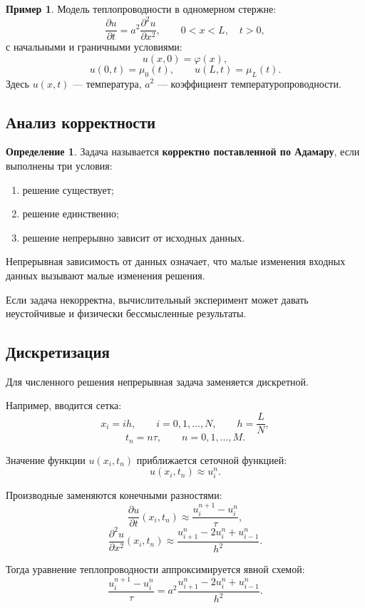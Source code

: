 \documentclass[12pt,a4paper]{article}
\theoremstyle{definition}
\newtheorem{definition}{Определение}
\newtheorem{example}{Пример}
\theoremstyle{plain}
\begin{document}
\begin{example}
Модель теплопроводности в одномерном стержне:
\[
\frac{\partial u}{\partial t}
=
a^2 \frac{\partial^2 u}{\partial x^2},
\qquad
0 < x < L,\quad t>0,
\]
с начальными и граничными условиями:
\[
u(x,0)=\varphi(x),
\]
\[
u(0,t)=\mu_0(t), \qquad u(L,t)=\mu_L(t).
\]
Здесь $u(x,t)$ --- температура, $a^2$ --- коэффициент температуропроводности.
\end{example}

\subsection{Анализ корректности}

\begin{definition}
Задача называется \textbf{корректно поставленной по Адамару}, если выполнены три условия:
\begin{enumerate}
    \item решение существует;
    \item решение единственно;
    \item решение непрерывно зависит от исходных данных.
\end{enumerate}
\end{definition}

Непрерывная зависимость от данных означает, что малые изменения входных данных вызывают малые изменения решения.

Если задача некорректна, вычислительный эксперимент может давать неустойчивые и физически бессмысленные результаты.

\subsection{Дискретизация}

Для численного решения непрерывная задача заменяется дискретной.

Например, вводится сетка:
\[
x_i = ih,\qquad i=0,1,\dots,N,\qquad h=\frac{L}{N},
\]
\[
t_n = n\tau,\qquad n=0,1,\dots,M.
\]

Значение функции $u(x_i,t_n)$ приближается сеточной функцией:
\[
u(x_i,t_n) \approx u_i^n.
\]

Производные заменяются конечными разностями:
\[
\frac{\partial u}{\partial t}(x_i,t_n)
\approx
\frac{u_i^{n+1}-u_i^n}{\tau},
\]
\[
\frac{\partial^2 u}{\partial x^2}(x_i,t_n)
\approx
\frac{u_{i+1}^n - 2u_i^n + u_{i-1}^n}{h^2}.
\]

Тогда уравнение теплопроводности аппроксимируется явной схемой:
\[
\frac{u_i^{n+1}-u_i^n}{\tau}
=
a^2
\frac{u_{i+1}^n - 2u_i^n + u_{i-1}^n}{h^2}.
\]
\end{document}
